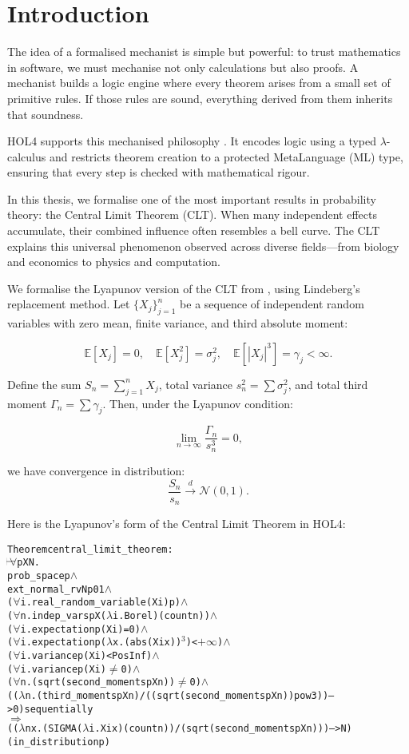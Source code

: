 \chapter[Introduction]{Introduction}
\label{chap:1}

The idea of a formalised mechanist is simple but powerful: to trust mathematics in software, we must mechanise not only calculations but also proofs. A mechanist builds a logic engine where every theorem arises from a small set of primitive rules. If those rules are sound, everything derived from them inherits that soundness.

HOL4 supports this mechanised philosophy \cite{slind2008brief}. It encodes logic using a typed \(\lambda\)-calculus and restricts theorem creation to a protected MetaLanguage (ML) type, ensuring that every step is checked with mathematical rigour.

In this thesis, we formalise one of the most important results in probability theory: the Central Limit Theorem (CLT). When many independent effects accumulate, their combined influence often resembles a bell curve. The CLT explains this universal phenomenon observed across diverse fields—from biology and economics to physics and computation.

We formalise the Lyapunov version of the CLT from \cite{Chung:2001}, using Lindeberg’s replacement method. Let $\{X_j\}_{j=1}^n$ be a sequence of independent random variables with zero mean, finite variance, and third absolute moment:

\[
\mathbb{E}[X_j] = 0,\quad \mathbb{E}[X_j^2] = \sigma_j^2,\quad \mathbb{E}[|X_j|^3] = \gamma_j < \infty.
\]

Define the sum \( S_n = \sum_{j=1}^n X_j \), total variance \( s_n^2 = \sum \sigma_j^2 \), and total third moment \( \Gamma_n = \sum \gamma_j \). Then, under the Lyapunov condition:

\[
\lim_{n \to \infty} \frac{\Gamma_n}{s_n^3} = 0,
\]

we have convergence in distribution:
\[
\frac{S_n}{s_n} \xrightarrow{d} \mathcal{N}(0, 1).
\]

Here is the Lyapunov's form of the Central Limit Theorem in HOL4:
\begin{hol}
  \begin{alltt}
    Theorem central\_limit\_theorem :
    \(\!\!\!{\turn}\!\!\!\!\) \(\forall\)p X N.
    prob\_space p \(\land\)
    ext\_normal\_rv N p 0 1 \(\land\)
    (\(\forall\)i. real\_random\_variable (X i) p) \(\land\)
    (\(\forall\)n. indep\_vars p X (\(\lambda\)i. Borel) (count n)) \(\land\)
    (\(\forall\)i. expectation p (X i) = 0) \(\land\)
    (\(\forall\)i. expectation p (\(\lambda\)x. (abs (X i x))\(^3\)) < \(+\infty\)) \(\land\)
    (\(\forall\)i. variance p (X i) < PosInf) \(\land\)
    (\(\forall\)i. variance p (X i) \(\ne\) 0) \(\land\)
    (\(\forall\)n. (sqrt (second\_moments p X n)) \(\ne\) 0) \(\land\)
    ((\(\lambda\)n. (third\_moments p X n) / ((sqrt (second\_moments p X n)) pow 3)) --> 0) sequentially
    \(\Rightarrow\)
    ((\(\lambda\)n x. (SIGMA (\(\lambda\)i. X i x) (count n)) / (sqrt (second\_moments p X n))) --> N)
    (in\_distribution p)
  \end{alltt}
\end{hol}

